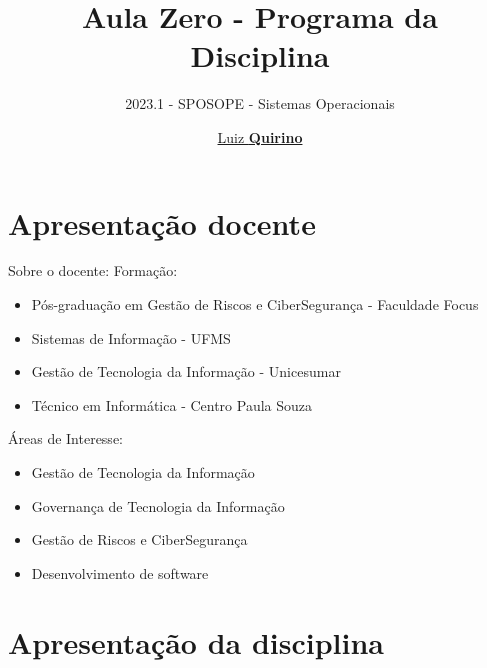 \documentclass{beamer}
\title{Aula Zero - Programa da Disciplina}
\subtitle{2023.1 - SPOSOPE -  Sistemas Operacionais}
\author{\href{mailto:luiz.quirino@ifsp.edu.br}{Luiz \textbf{Quirino}}}
\newcommand{\hrefcol}[2]{\textcolor{cyan}{\href{#1}{#2}}}
\begin{document}
\maketitle

%
%


\section{Apresentação docente}

\begin{frame}{Sobre o docente:}
Formação:
\begin{itemize}
\item Pós-graduação em Gestão de Riscos e CiberSegurança - Faculdade Focus
\item Sistemas de Informação - UFMS
\item Gestão de Tecnologia da Informação - Unicesumar
\item Técnico em Informática - Centro Paula Souza
\end{itemize}
Áreas de Interesse:
\begin{itemize}
\item Gestão de Tecnologia da Informação
\item Governança de Tecnologia da Informação
\item Gestão de Riscos e CiberSegurança
\item Desenvolvimento de software
\end{itemize}
\end{frame}

\section{Apresentação da disciplina}
\end{document}
